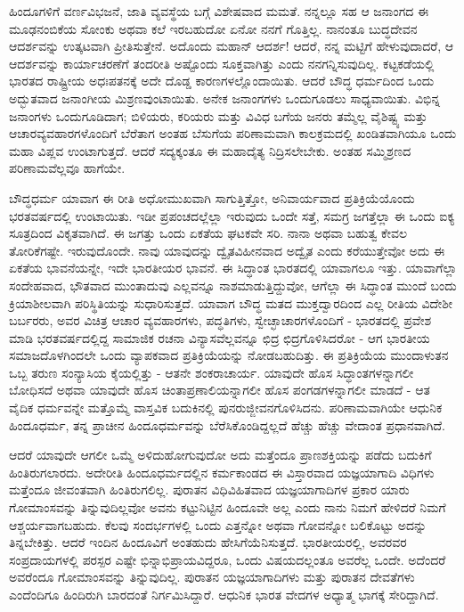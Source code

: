 ಹಿಂದೂಗಳಿಗೆ ವರ್ಣವಿಭಜನೆ, ಜಾತಿ ವ್ಯವಸ್ಥೆಯ ಬಗ್ಗೆ ವಿಶೇಷವಾದ ಮಮತೆ. ನನ್ನಲ್ಲೂ ಸಹ ಆ ಜನಾಂಗದ ಈ ಮೂಢನಂಬಿಕೆಯ ಸೋಂಕು ಅಥವಾ ಕಲೆ ಇರಬಹುದೋ ಏನೋ ನನಗೆ ಗೊತ್ತಿಲ್ಲ. ನಾನಂತೂ ಬುದ್ಧದೇವನ ಆದರ್ಶವನ್ನು ಉತ್ಕಟವಾಗಿ ಪ್ರೀತಿಸುತ್ತೇನೆ. ಅದೊಂದು ಮಹಾನ್ ಆದರ್ಶ! ಆದರೆ, ನನ್ನ ಮಟ್ಟಿಗೆ ಹೇಳುವುದಾದರೆ, ಆ ಆದರ್ಶವನ್ನು ಕಾರ್ಯಾಚರಣೆಗೆ ತಂದರೀತಿ ಅಷ್ಟೊಂದು ಸೂಕ್ತವಾಗಿತ್ತು ಎಂದು ನನಗನ್ನಿಸುವುದಿಲ್ಲ. ಕಟ್ಟಕಡೆಯಲ್ಲಿ ಭಾರತದ ರಾಷ್ಟ್ರೀಯ ಅಧಃಪತನಕ್ಕೆ ಅದೇ ದೊಡ್ಡ ಕಾರಣಗಳಲ್ಲೊಂದಾಯಿತು. ಆದರೆ ಬೌದ್ಧ ಧರ್ಮದಿಂದ ಒಂದು ಅದ್ಭುತವಾದ ಜನಾಂಗೀಯ ಮಿಶ್ರಣವುಂಟಾಯಿತು. ಅನೇಕ ಜನಾಂಗಗಳು ಒಂದುಗೂಡಲು ಸಾಧ್ಯವಾಯಿತು. ವಿಭಿನ್ನ ಜನಾಂಗಳು ಒಂದುಗೂಡಿದಾಗ; ಬಿಳಿಯರು, ಕರಿಯರು ಮತ್ತು ವಿವಿಧ ಬಗೆಯ ಜನರು ತಮ್ಮೆಲ್ಲ ವೈಶಿಷ್ಟ್ಯ ಮತ್ತು ಆಚಾರವ್ಯವಹಾರಗಳೊಂದಿಗೆ ಬೆರೆತಾಗ ಅಂತಹ ಬೆಸುಗೆಯ ಪರಿಣಾಮವಾಗಿ ಕಾಲಕ್ರಮದಲ್ಲಿ ಖಂಡಿತವಾಗಿಯೂ ಒಂದು ಮಹಾ ವಿಪ್ಲವ ಉಂಟಾಗುತ್ತದೆ. ಆದರೆ ಸದ್ಯಕ್ಕಂತೂ ಈ ಮಹಾದೈತ್ಯ ನಿದ್ರಿಸಲೇಬೇಕು. ಅಂತಹ ಸಮ್ಮಿಶ್ರಣದ ಪರಿಣಾಮವೆಲ್ಲವೂ ಹಾಗೆಯೇ.

ಬೌದ್ಧಧರ್ಮ ಯಾವಾಗ ಈ ರೀತಿ ಅಧೋಮುಖವಾಗಿ ಸಾಗುತ್ತಿತ್ತೋ, ಅನಿವಾರ್ಯವಾದ ಪ್ರತಿಕ್ರಿಯೆಯೊಂದು ಭರತವರ್ಷದಲ್ಲಿ ಉಂಟಾಯಿತು. ಇಡೀ ಪ್ರಪಂಚದಲ್ಲೆಲ್ಲಾ ಇರುವುದು ಒಂದೇ ಸತ್ತೆ, ಸಮಗ್ರ ಜಗತ್ತೆಲ್ಲಾ ಈ ಒಂದು ಐಕ್ಯ ಸೂತ್ರದಿಂದ ವಿಕೃತವಾಗಿದೆ. ಈ ಜಗತ್ತು ಒಂದು ಏಕತೆಯ ಘಟಕವೇ ಸರಿ. ನಾನಾ ಅಥವಾ ಬಹುತ್ವ ಕೇವಲ ತೋರಿಕೆಗಷ್ಟೇ. ಇರುವುದೊಂದೇ. ನಾವು ಯಾವುದನ್ನು ದ್ವೈತವಿಹೀನವಾದ ಅದ್ವೈತ ಎಂದು ಕರೆಯುತ್ತೇವೋ ಅದು ಈ ಏಕತೆಯ ಭಾವನೆಯನ್ನೇ, ಇದೇ ಭಾರತೀಯರ ಭಾವನೆ. ಈ ಸಿದ್ಧಾಂತ ಭಾರತದಲ್ಲಿ ಯಾವಾಗಲೂ ಇತ್ತು. ಯಾವಾಗೆಲ್ಲಾ ಸಂದೇಹವಾದ, ಭೌತವಾದ ಮುಂತಾದುವು ಎಲ್ಲವನ್ನೂ ನಾಶಮಾಡುತ್ತಿದ್ದುವೋ, ಆಗೆಲ್ಲಾ ಈ ಸಿದ್ಧಾಂತ ಮುಂದೆ ಬಂದು ಕ್ರಿಯಾಶೀಲವಾಗಿ ಪರಿಸ್ಥಿತಿಯನ್ನು ಸುಧಾರಿಸುತ್ತದೆ. ಯಾವಾಗ ಬೌದ್ಧ ಮತದ ಮುಕ್ತದ್ವಾರದಿಂದ ಎಲ್ಲ ರೀತಿಯ ವಿದೇಶೀ ಬರ್ಬರರು, ಅವರ ವಿಚಿತ್ರ ಆಚಾರ ವ್ಯವಹಾರಗಳು, ಪದ್ಧತಿಗಳು, ಸ್ವೇಚ್ಛಾಚಾರಗಳೊಂದಿಗೆ - ಭಾರತದಲ್ಲಿ ಪ್ರವೇಶ ಮಾಡಿ ಭರತವರ್ಷದಲ್ಲಿದ್ದ ಸಾಮಾಜಿಕ ರಚನಾ ವಿನ್ಯಾಸವೆಲ್ಲವನ್ನೂ ಛಿದ್ರ ಛಿದ್ರಗೊಳಿಸಿದರೋ - ಆಗ ಭಾರತೀಯ ಸಮಾಜದೊಳಗಿಂದಲೇ ಒಂದು ವ್ಯಾಪಕವಾದ ಪ್ರತಿಕ್ರಿಯೆಯನ್ನು ನೋಡಬಹುದಿತ್ತು. ಈ ಪ್ರತಿಕ್ರಿಯೆಯ ಮುಂದಾಳುತನ ಒಬ್ಬ ತರುಣ ಸಂನ್ಯಾಸಿಯ ಕೈಯಲ್ಲಿತ್ತು - ಆತನೇ ಶಂಕರಾಚಾರ್ಯ. ಯಾವುದೇ ಹೊಸ ಸಿದ್ಧಾಂತಗಳನ್ನಾಗಲೀ ಬೋಧಿಸದೆ ಅಥವಾ ಯಾವುದೇ ಹೊಸ ಚಿಂತಾಪ್ರಣಾಲಿಯನ್ನಾಗಲೀ ಹೊಸ ಪಂಗಡಗಳನ್ನಾಗಲೀ ಮಾಡದೆ - ಆತ ವೈದಿಕ ಧರ್ಮವನ್ನೇ ಮತ್ತೊಮ್ಮೆ ವಾಸ್ತವಿಕ ಬದುಕಿನಲ್ಲಿ ಪುನರುಜ್ಜೀವನಗೊಳಿಸಿದನು. ಪರಿಣಾಮವಾಗಿಯೇ ಆಧುನಿಕ ಹಿಂದೂಧರ್ಮ, ತನ್ನ ಪ್ರಾಚೀನ ಹಿಂದೂಧರ್ಮವನ್ನು ಬೆರೆಸಿಕೊಂಡಿದ್ದಲ್ಲದೆ ಹೆಚ್ಚು ಹೆಚ್ಚು ವೇದಾಂತ ಪ್ರಧಾನವಾಗಿದೆ.

ಆದರೆ ಯಾವುದೇ ಆಗಲೀ ಒಮ್ಮೆ ಅಳಿದುಹೋಗುವುದೋ ಅದು ಮತ್ತೆಂದೂ ಪ್ರಾಣಶಕ್ತಿಯನ್ನು ಪಡೆದು ಬದುಕಿಗೆ ಹಿಂತಿರುಗಲಾರದು. ಅದೇರೀತಿ ಹಿಂದೂಧರ್ಮದಲ್ಲಿನ ಕರ್ಮಕಾಂಡದ ಈ ವಿಸ್ತಾರವಾದ ಯಜ್ಞಯಾಗಾದಿ ವಿಧಿಗಳು ಮತ್ತೆಂದೂ ಜೀವಂತವಾಗಿ ಹಿಂತಿರುಗಲಿಲ್ಲ. ಪುರಾತನ ವಿಧಿವಿಹಿತವಾದ ಯಜ್ಞಯಾಗಾದಿಗಳ ಪ್ರಕಾರ ಯಾರು ಗೋಮಾಂಸವನ್ನು ತಿನ್ನುವುದಿಲ್ಲವೋ ಅವನು ಕಟ್ಟುನಿಟ್ಟಿನ ಹಿಂದೂವೇ ಅಲ್ಲ ಎಂದು ನಾನು ನಿಮಗೆ ಹೇಳಿದರೆ ನಿಮಗೆ ಆಶ್ಚರ್ಯವಾಗಬಹುದು. ಕೆಲವು ಸಂದರ್ಭಗಳಲ್ಲಿ ಒಂದು ಎತ್ತನ್ನೋ ಅಥವಾ ಗೋವನ್ನೋ ಬಲಿಕೊಟ್ಟು ಅದನ್ನು ತಿನ್ನಬೇಕಿತ್ತು. ಆದರೆ ಇಂದಿನ ಹಿಂದೂವಿಗೆ ಅಂತಹುದು ಹೇಸಿಗೆಯೆನಿಸುತ್ತದೆ. ಭಾರತೀಯರಲ್ಲಿ, ಅವರವರ ಸಂಪ್ರದಾಯಗಳಲ್ಲಿ ಪರಸ್ಪರ ಎಷ್ಟೇ ಭಿನ್ನಾಭಿಪ್ರಾಯವಿದ್ದರೂ, ಒಂದು ವಿಷಯದಲ್ಲಂತೂ ಅವರೆಲ್ಲ ಒಂದೇ. ಅದೆಂದರೆ ಅವರೆಂದೂ ಗೋಮಾಂಸವನ್ನು ತಿನ್ನುವುದಿಲ್ಲ. ಪುರಾತನ ಯಜ್ಞಯಾಗಾದಿಗಳು ಮತ್ತು ಪುರಾತನ ದೇವತೆಗಳು ಎಂದೆಂದಿಗೂ ಹಿಂದಿರುಗಿ ಬಾರದಂತೆ ನಿರ್ಗಮಿಸಿದ್ದಾರೆ. ಆಧುನಿಕ ಭಾರತ ವೇದಗಳ ಅಧ್ಯಾತ್ಮ ಭಾಗಕ್ಕೆ ಸೇರಿದ್ದಾಗಿದೆ.

